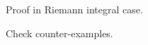 \begin{enumerate}
\begin{itemize}
Proof in Riemann integral case.

Check counter-examples.
\end{itemize}

\end{enumerate}





















